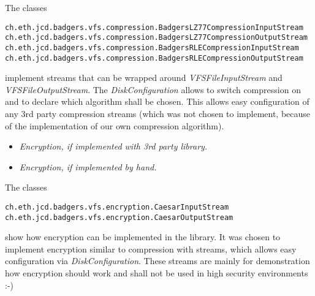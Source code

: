 The classes
\begin{verbatim}
ch.eth.jcd.badgers.vfs.compression.BadgersLZ77CompressionInputStream
ch.eth.jcd.badgers.vfs.compression.BadgersLZ77CompressionOutputStream
ch.eth.jcd.badgers.vfs.compression.BadgersRLECompressionInputStream
ch.eth.jcd.badgers.vfs.compression.BadgersRLECompressionOutputStream
\end{verbatim}
implement streams that can be wrapped around \textit{VFSFileInputStream} and
\textit{VFSFileOutputStream}. The \textit{DiskConfiguration} allows
to switch compression on and to declare which algorithm shall be chosen. This
allows easy configuration of any 3rd party compression streams (which was not
chosen to implement, because of the implementation of our own compression
algorithm).

\begin{itemize}
  \item \emph{Encryption, if implemented with 3rd party library.}
  \item \emph{Encryption, if implemented by hand.}
\end{itemize}

The classes
\begin{verbatim}
ch.eth.jcd.badgers.vfs.encryption.CaesarInputStream
ch.eth.jcd.badgers.vfs.encryption.CaesarOutputStream
\end{verbatim}
show how encryption can be implemented in the library. It was chosen to
implement encryption similar to compression with streams, which allows easy
configuration via \textit{DiskConfiguration}. These streams are mainly for
demonstration how encryption should work and shall not be used in high
security environments :-)
